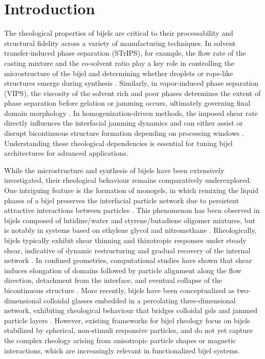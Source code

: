 
\section{Introduction}

The rheological properties of bijels are critical to their processability and structural fidelity across a variety of manufacturing techniques. In solvent transfer-induced phase separation 
(STrIPS), for example, the flow rate of the casting mixture and the co-solvent ratio play a key role in controlling the microstructure of the bijel and determining whether droplets or 
rope-like structures emerge during synthesis \cite{haase_continuous_2015, haase_situ_2016}. Similarly, in vapor-induced phase separation (VIPS), the viscosity of the solvent rich and poor 
phases determines the extent of phase separation before gelation or jamming occurs, ultimately governing final domain morphology \cite{wang_scalable_2020}. In homogenization-driven methods, 
the imposed shear rate directly influences the interfacial jamming dynamics and can either assist or disrupt bicontinuous structure formation depending on processing windows 
\cite{huang_bicontinuous_2017}. Understanding these rheological dependencies is essential for tuning bijel architectures for advanced applications.

While the microstructure and synthesis of bijels have been extensively investigated, their rheological behaviour remains comparatively underexplored. One intriguing feature is the formation of 
monogels, in which remixing the liquid phases of a bijel preserves the interfacial particle network due to persistent attractive interactions between particles \cite{sanz_colloidal_2009}. This 
phenomenon has been observed in bijels composed of lutidine/water and styrene/butadiene oligomer mixtures, but is notably in systems based on ethylene glycol and nitromethane 
\cite{sanz_colloidal_2009, bai_dynamics_2015, tavacoli_novel_2011}. Rheologically, bijels typically exhibit shear thinning and thixotropic responses under steady shear, indicative of dynamic 
restructuring and gradual recovery of the internal network \cite{macmillan_rheological_2019}. In confined geometries, computational studies have shown that shear induces elongation 
of domains followed by particle alignment along the flow direction, detachment from the interface, and eventual collapse of the bicontinuous structure \cite{bonaccorso_shear_2020}. More recently, 
bijels have been conceptualized as two-dimensional colloidal glasses embedded in a percolating three-dimensional network, exhibiting rheological behaviour that bridges colloidal gels and jammed 
particle layers \cite{ching_bijel_2022}. However, existing frameworks for bijel rheology focus on bijels stabilized by spherical, non-stimuli responsive particles, and do not yet capture the complex 
rheology arising from anisotropic particle shapes or magnetic interactions, which are increasingly relevant in functionalized bijel systems.

